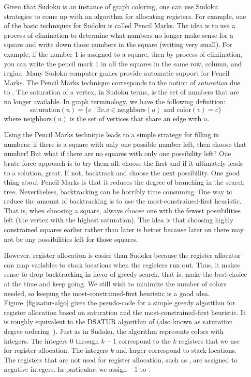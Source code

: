 \documentclass[11pt]{book}
\begin{document}
Given that Sudoku is an instance of graph coloring, one can use Sudoku
strategies to come up with an algorithm for allocating registers. For
example, one of the basic techniques for Sudoku is called Pencil
Marks. The idea is to use a process of elimination to determine what
numbers no longer make sense for a square and write down those
numbers in the square (writing very small). For example, if the number
$1$ is assigned to a square, then by process of elimination, you can
write the pencil mark $1$ in all the squares in the same row, column,
and region. Many Sudoku computer games provide automatic support for
Pencil Marks.
%
The Pencil Marks technique corresponds to the notion of
\emph{saturation} due to \cite{Brelaz:1979eu}.
The saturation of a
vertex, in Sudoku terms, is the set of numbers that are no longer
available. In graph terminology, we have the following definition:
\begin{equation*}
  \mathrm{saturation}(u) = \{ c \;|\; \exists v. v \in \mathrm{neighbors}(u)
     \text{ and } \mathrm{color}(v) = c \}
\end{equation*}
where $\mathrm{neighbors}(u)$ is the set of vertices that share an
edge with $u$.

Using the Pencil Marks technique leads to a simple strategy for
filling in numbers: if there is a square with only one possible number
left, then choose that number! But what if there are no squares with
only one possibility left? One brute-force approach is to try them
all: choose the first  and if it ultimately leads to a solution,
great.  If not, backtrack and choose the next possibility.  One good
thing about Pencil Marks is that it reduces the degree of branching in
the search tree. Nevertheless, backtracking can be horribly time
consuming. One way to reduce the amount of backtracking is to use the
most-constrained-first heuristic. That is, when choosing a square,
always choose one with the fewest possibilities left (the vertex with
the highest saturation).  The idea is that choosing highly constrained
squares earlier rather than later is better because later on there may
not be any possibilities left for those squares.

However, register allocation is easier than Sudoku because the
register allocator can map variables to stack locations when the
registers run out. Thus, it makes sense to drop backtracking in favor
of greedy search, that is, make the best choice at the time and keep
going. We still wish to minimize the number of colors needed, so
keeping the most-constrained-first heuristic is a good idea.
Figure~\ref{fig:satur-algo} gives the pseudo-code for a simple greedy
algorithm for register allocation based on saturation and the
most-constrained-first heuristic. It is roughly equivalent to the
DSATUR algorithm of \cite{Brelaz:1979eu} (also known as saturation
degree ordering~\citep{Gebremedhin:1999fk,Omari:2006uq}).  Just as in
Sudoku, the algorithm represents colors with integers. The integers
$0$ through $k-1$ correspond to the $k$ registers that we use for
register allocation. The integers $k$ and larger correspond to stack
locations. The registers that are not used for register allocation,
such as , are assigned to negative integers. In particular,
we assign $-1$ to .
\end{document}
